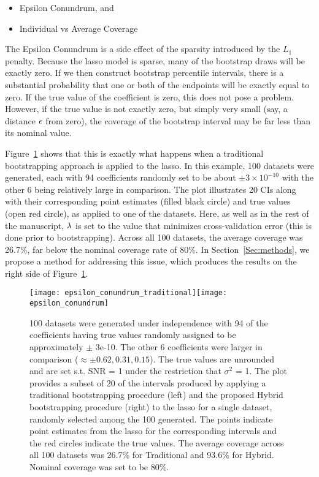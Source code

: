 \begin{itemize}
\item Epsilon Conundrum, and
\item Individual vs Average Coverage
\end{itemize}

The Epsilon Conundrum is a side effect of the sparsity introduced by the $L_1$ penalty. Because the lasso model is sparse, many of the bootstrap draws will be exactly zero. If we then construct bootstrap percentile intervals, there is a substantial probability that one or both of the endpoints will be exactly equal to zero. If the true value of the coefficient is zero, this does not pose a problem. However, if the true value is not exactly zero, but simply very small (say, a distance $\epsilon$ from zero), the coverage of the bootstrap interval may be far less than its nominal value.

Figure~\ref{Fig:ec} shows that this is exactly what happens when a traditional bootstrapping approach is applied to the lasso. In this example, 100 datasets were generated, each with 94 coefficients randomly set to be about $\pm 3 \times 10^{-10}$ with the other 6 being relatively large in comparison. The plot illustrates 20 CIs along with their corresponding point estimates (filled black circle) and true values (open red circle), as applied to one of the datasets. Here, as well as in the rest of the manuscript, $\lambda$ is set to the value that minimizes cross-validation error (this is done prior to bootstrapping). Across all 100 datasets, the average coverage was 26.7\%, far below the nominal coverage rate of 80\%. In Section~\ref{Sec:methods}, we propose a method for addressing this issue, which produces the results on the right side of Figure~\ref{Fig:ec}.

\begin{figure}[hbtp]
  \begin{center}
    \texttt{[image: epsilon\_conundrum\_traditional]}\texttt{[image: epsilon\_conundrum]}
    \caption{\label{Fig:ec} 100 datasets were generated under independence with 94 of the coefficients having true values randomly assigned to be approximately $\pm$ 3e-10. The other 6 coefficients were larger in comparison ($\approx \pm 0.62, 0.31, 0.15$). The true values are unrounded and are set s.t. SNR = 1 under the restriction that $\sigma^2$ = 1. The plot provides a subset of 20 of the intervals produced by applying a traditional bootstrapping procedure (left) and the proposed Hybrid bootstrapping procedure (right) to the lasso for a single dataset, randomly selected among the 100 generated. The points indicate point estimates from the lasso for the corresponding intervals and the red circles indicate the true values. The average coverage across all 100 datasets was 26.7\% for Traditional and 93.6\% for Hybrid. Nominal coverage was set to be 80\%.}
  \end{center}
\end{figure}

